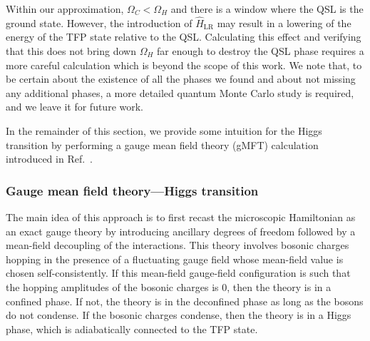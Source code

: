 \documentclass[twocolumn,superscriptaddress,amsmath,amssymb,aps,prx,nofootinbib]{revtex4-2}
\begin{document}
Within our approximation, $\Omega_C<\Omega_H$ and there is a window where the QSL is the ground state. However, the introduction of $\hat{H}_{\text{LR}}$ may result in a lowering of the energy of the TFP state relative to the QSL. Calculating this effect and verifying that this does not bring down $\Omega_H$ far enough to destroy the QSL phase requires a more careful calculation which is beyond the scope of this work.
We note that, to be certain about the existence of all the phases we found and about not missing any additional phases, a more detailed quantum Monte Carlo study is required, and we leave it for future work.

In the remainder of this section, we provide some intuition for the Higgs transition by performing a gauge mean field theory (gMFT) calculation introduced in Ref.~\cite{savary2012coulombic}. 

\subsubsection{Gauge mean field theory---Higgs transition}\label{sec:gmft}
The main idea of this approach is to first recast the microscopic Hamiltonian as an exact gauge theory by introducing ancillary degrees of freedom followed by a mean-field decoupling of the interactions. This theory involves bosonic charges hopping in the presence of a fluctuating gauge field whose mean-field value is chosen self-consistently. If this mean-field gauge-field configuration is such that the hopping amplitudes of the bosonic charges is 0, then the theory is in a confined phase. If not, the theory is in the deconfined phase as long as the bosons do not condense. If the bosonic charges condense, then the theory is in a Higgs phase, which is adiabatically connected to the TFP state.
\end{document}
